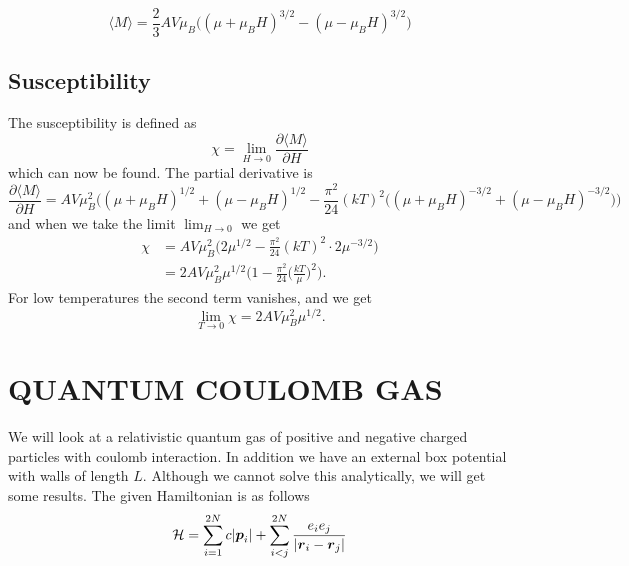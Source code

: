 \documentclass[norsk,a4paper,12pt]{article}
\begin{document}
\begin{equation}
\langle M\rangle=\frac{2}{3}AV\mu_B\Big((\mu+\mu_BH)^{3/2}-(\mu-\mu_BH)^{3/2}\Big)
\end{equation}

\subsection{Susceptibility}
The susceptibility is defined as
\begin{equation}
\chi=\lim_{H\rightarrow0}\frac{\partial \langle M\rangle}{\partial H}
\end{equation}
which can now be found. The partial derivative is
\begin{equation}
\frac{\partial \langle M\rangle}{\partial H}=AV\mu_B^2\bigg((\mu+\mu_BH)^{1/2}+(\mu-\mu_BH)^{1/2}-\frac{\pi^2}{24}(kT)^2\Big((\mu+\mu_BH)^{-3/2} + (\mu-\mu_BH)^{-3/2}\Big)\bigg)
\end{equation}
and when we take the limit $\lim_{H\rightarrow 0}$ we get
\begin{align}
\chi&=AV\mu_B^2\bigg(2\mu^{1/2}-\frac{\pi^2}{24}(kT)^2\cdot2\mu^{-3/2}\bigg)\\
&=2AV\mu_B^2\mu^{1/2}\bigg(1-\frac{\pi^2}{24}\Big(\frac{kT}{\mu}\Big)^2\bigg).
\end{align}
For low temperatures the second term vanishes, and we get
\begin{equation}
\lim_{T\rightarrow 0}\chi=2AV\mu_B^2\mu^{1/2}.
\end{equation}


\newpage
\section{QUANTUM COULOMB GAS}
We will look at a relativistic quantum gas of positive and negative charged particles with coulomb interaction. In addition we have an external box potential with walls of length $L$. Although we cannot solve this analytically, we will get some results. The given Hamiltonian is as follows
\begin{equation}
{\cal H}=\sum_{i=1}^{2N}c|\boldsymbol{p}_i|+\sum_{i<j}^{2N}\frac{e_ie_j}{|\boldsymbol{r}_i - \boldsymbol{r}_j|}
\end{equation}
\end{document}
